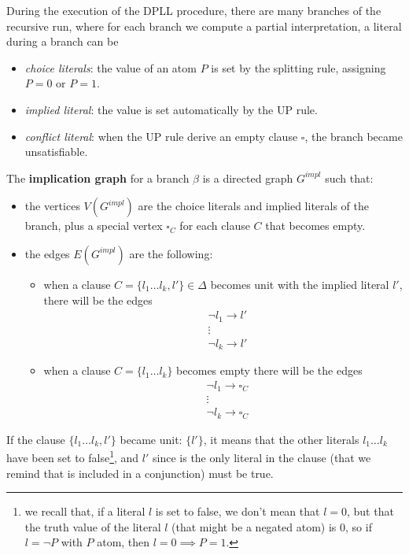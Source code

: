 \documentclass[10pt, letterpaper]{report}
\begin{document}
During the execution of the DPLL procedure, there are many branches of the recursive run, where for each branch we compute a partial interpretation, a literal during a branch can be\begin{itemize}
    \item \textit{choice literals}: the value of an atom $P$ is set by the splitting rule, assigning $P=0$ or $P=1$. 
    \item \textit{implied literal}: the value is set automatically by the UP rule. 
    \item \textit{conflict literal}: when the UP rule derive an empty clause $\square$, the branch became unsatisfiable.
\end{itemize}
\begin{definition}
    The \textbf{implication graph} for a branch $\beta$ is a directed graph $G^{impl}$ such that:
\end{definition}
    \begin{itemize}
        \item the vertices $V(G^{impl})$ are the choice literals and implied literals of the branch, plus a special vertex $\square_C$ for each clause $C$ that becomes empty. 
        \item the edges $E(G^{impl})$ are the following:\begin{itemize}
            \item when a clause $C=\{l_1\dots l_k,l'\}\in \Delta$ becomes unit with the implied literal $l'$, there will be the edges\begin{align}
                &\lnot l_1\longrightarrow l'\\ &\vdots\\
                &\lnot l_k\longrightarrow l'
            \end{align}
            \item when  a clause $C=\{l_1\dots l_k\}$ becomes empty there will be the edges\begin{align}
                &\lnot l_1\longrightarrow \square_C\\ &\vdots\\
                &\lnot l_k\longrightarrow \square_C
            \end{align}
        \end{itemize} 
    \end{itemize}
If the clause $\{l_1\dots l_k,l'\}$ became unit: $\{l'\}$, it means that the other literals $l_1\dots l_k$ have been set to false\footnote{
    we recall that, if a literal $l$ is set to false, we don't mean that $l=0$, but that the truth value of the literal $l$ (that might be a negated atom) is 0, so if $l=\lnot P$ with $P$ atom, then $l=0\implies P=1$.
}, and $l'$ since is the only literal in the clause (that we remind that is included in a conjunction) must be true.
\end{document}

